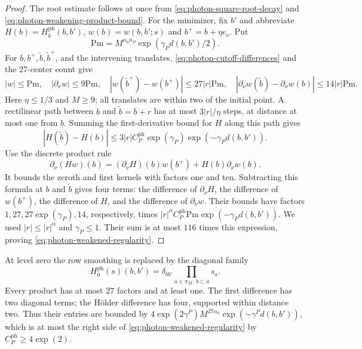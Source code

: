 \begin{proof}
The root estimate follows at once from
\eqref{eq:photon-square-root-decay} and
\eqref{eq:photon-weakening-product-bound}.
For the minimizer, fix $b'$ and abbreviate
$H(b)=H_k^{\mathrm{ph}}(b,b')$, $w(b)=w(b,b';s)$ and
$b^+=b+\eta e_\nu$. Put
\[
 \mathrm{Pm}=M^{\alpha_0n_P}\exp(\gamma_Pd(b,b')/2).
\]
For $b,b^+,\tilde b,\tilde b^+$, and the intervening translates,
\eqref{eq:photon-cutoff-differences} and the $27$-center count
give
\[
 |w|\le\mathrm{Pm},\quad |\partial_\nu w|\le9\mathrm{Pm},\quad
 |w(\tilde b^+)-w(b^+)|\le27|r|\mathrm{Pm},\quad
 |\partial_\nu w(\tilde b)-\partial_\nu w(b)|
                                             \le14|r|\mathrm{Pm}.
\]
Here $\eta\le1/3$ and $M\ge9$; all translates are within two
of the initial point. A rectilinear path between $b$ and
$\tilde b=b+r$ has at most $3|r|/\eta$ steps, at distance at
most one from $b$. Summing the first-derivative bound for $H$
along this path gives
\[
 |H(\tilde b)-H(b)|
       \le3|r|C_P^{\mathrm{ph}}\exp(\gamma_P)\exp(-\gamma_Pd(b,b')).
\]
Use the discrete product rule
\[
 \partial_\nu(Hw)(b)
             =(\partial_\nu H)(b)w(b^+)+H(b)\partial_\nu w(b).
\]
It bounds the zeroth and first kernels with factors one and ten.
Subtracting this formula at $b$ and $\tilde b$ gives four terms:
the difference of $\partial_\nu H$, the difference of $w(b^+)$,
the difference of $H$, and the difference of $\partial_\nu w$.
Their bounds have factors $1,27,27\exp(\gamma_P),14$, respectively,
times
$|r|^\alpha C_P^{\mathrm{ph}}\mathrm{Pm}\exp(-\gamma_Pd(b,b'))$.
We used $|r|\le|r|^\alpha$ and $\gamma_P\le1$.
Their sum is at most $116$ times this expression, proving
\eqref{eq:photon-weakened-regularity}.
\end{proof}

At level zero the row smoothing is replaced by the diagonal
family
\begin{equation}\label{eq:photon-weakened-level-zero}
 H_0^{\mathrm{ph}}(s)(b,b')
               =\delta_{bb'}\prod_{a\in\pi_M:\,b\subset a}s_a.
\end{equation}
Every product has at most $27$ factors and at least one. The
first difference has two diagonal terms; the H\"older difference
has four, supported within distance two. Thus their entries are
bounded by $4\exp(2\gamma^P)M^{27\alpha_0}
\exp(-\gamma^Pd(b,b'))$, which is at most the right side of
\eqref{eq:photon-weakened-regularity} by $C_P^{\mathrm{ph}}\ge4\exp(2)$.

